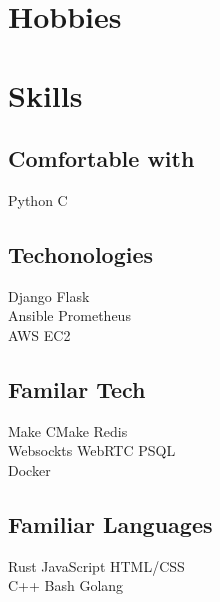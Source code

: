 \documentclass[]{resume-openfont}
\begin{document}
\begin{minipage}[t]{0.33\textwidth}
\section{Hobbies}
\sectionsep

\vspace{-2mm} %

\section{Skills}
\subsection{Comfortable with}
Python \textbullet{} C
\sectionsep
\subsection{Techonologies}
Django \textbullet{} Flask \\
Ansible \textbullet{} Prometheus \\
AWS EC2 \textbullet{}
\sectionsep
\subsection{Familar Tech}
Make \textbullet{} CMake \textbullet{} Redis\\
Websockts \textbullet{} WebRTC \textbullet{} PSQL\\
Docker\\
\sectionsep
\subsection{Familiar Languages}
Rust \textbullet{} JavaScript\textbullet{} HTML/CSS \\
C++ \textbullet{} Bash \textbullet{} Golang
\sectionsep

%
%

\end{minipage}
\hfill
\end{document}
